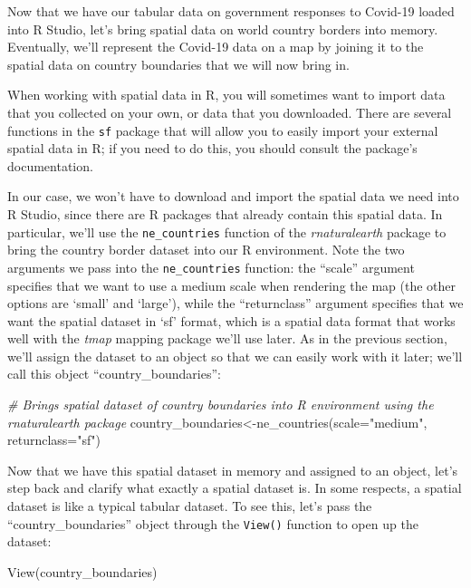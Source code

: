 \documentclass[
]{article}
\newenvironment{Shaded}{\begin{snugshade}}{\end{snugshade}}
\newcommand{\AttributeTok}[1]{\textcolor[rgb]{0.77,0.63,0.00}{#1}}
\newcommand{\CommentTok}[1]{\textcolor[rgb]{0.56,0.35,0.01}{\textit{#1}}}
\newcommand{\FunctionTok}[1]{\textcolor[rgb]{0.00,0.00,0.00}{#1}}
\newcommand{\NormalTok}[1]{#1}
\newcommand{\OtherTok}[1]{\textcolor[rgb]{0.56,0.35,0.01}{#1}}
\newcommand{\StringTok}[1]{\textcolor[rgb]{0.31,0.60,0.02}{#1}}
\begin{document}
Now that we have our tabular data on government responses to Covid-19 loaded into R Studio, let's bring spatial data on world country borders into memory. Eventually, we'll represent the Covid-19 data on a map by joining it to the spatial data on country boundaries that we will now bring in.

When working with spatial data in R, you will sometimes want to import data that you collected on your own, or data that you downloaded. There are several functions in the \texttt{sf} package that will allow you to easily import your external spatial data in R; if you need to do this, you should consult the package's documentation.

In our case, we won't have to download and import the spatial data we need into R Studio, since there are R packages that already contain this spatial data. In particular, we'll use the \texttt{ne\_countries} function of the \emph{rnaturalearth} package to bring the country border dataset into our R environment. Note the two arguments we pass into the \texttt{ne\_countries} function: the ``scale'' argument specifies that we want to use a medium scale when rendering the map (the other options are `small' and `large'), while the ``returnclass'' argument specifies that we want the spatial dataset in `sf' format, which is a spatial data format that works well with the \emph{tmap} mapping package we'll use later. As in the previous section, we'll assign the dataset to an object so that we can easily work with it later; we'll call this object ``country\_boundaries'':

\begin{Shaded}
\begin{Highlighting}[]
\CommentTok{\# Brings spatial dataset of country boundaries into R environment using the rnaturalearth package}
\NormalTok{country\_boundaries}\OtherTok{\textless{}{-}}\FunctionTok{ne\_countries}\NormalTok{(}\AttributeTok{scale=}\StringTok{"medium"}\NormalTok{, }\AttributeTok{returnclass=}\StringTok{"sf"}\NormalTok{)}
\end{Highlighting}
\end{Shaded}

Now that we have this spatial dataset in memory and assigned to an object, let's step back and clarify what exactly a spatial dataset is. In some respects, a spatial dataset is like a typical tabular dataset. To see this, let's pass the ``country\_boundaries'' object through the \texttt{View()} function to open up the dataset:

\begin{Shaded}
\begin{Highlighting}[]
\FunctionTok{View}\NormalTok{(country\_boundaries)}
\end{Highlighting}
\end{Shaded}
\end{document}
